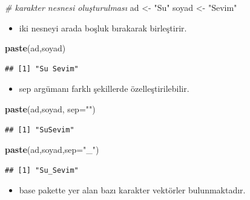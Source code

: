 \documentclass[
  oneside]{book}
\newenvironment{Shaded}{\begin{snugshade}}{\end{snugshade}}
\newcommand{\AttributeTok}[1]{\textcolor[rgb]{0.13,0.29,0.53}{#1}}
\newcommand{\CommentTok}[1]{\textcolor[rgb]{0.56,0.35,0.01}{\textit{#1}}}
\newcommand{\FunctionTok}[1]{\textcolor[rgb]{0.13,0.29,0.53}{\textbf{#1}}}
\newcommand{\NormalTok}[1]{#1}
\newcommand{\OtherTok}[1]{\textcolor[rgb]{0.56,0.35,0.01}{#1}}
\newcommand{\StringTok}[1]{\textcolor[rgb]{0.31,0.60,0.02}{#1}}
\providecommand{\tightlist}{%
  \setlength{\itemsep}{0pt}\setlength{\parskip}{0pt}}
\begin{document}
\begin{Shaded}
\begin{Highlighting}[]
\CommentTok{\# karakter nesnesi oluşturulması}
\NormalTok{ad }\OtherTok{\textless{}{-}} \StringTok{"Su"}
\NormalTok{soyad }\OtherTok{\textless{}{-}} \StringTok{"Sevim"}
\end{Highlighting}
\end{Shaded}

\begin{itemize}
\tightlist
\item
  iki nesneyi arada boşluk bırakarak birleştirir.
\end{itemize}

\begin{Shaded}
\begin{Highlighting}[]
\FunctionTok{paste}\NormalTok{(ad,soyad)}
\end{Highlighting}
\end{Shaded}

\begin{verbatim}
## [1] "Su Sevim"
\end{verbatim}

\begin{itemize}
\tightlist
\item
  sep argümanı farklı şekillerde özelleştirilebilir.
\end{itemize}

\begin{Shaded}
\begin{Highlighting}[]
\FunctionTok{paste}\NormalTok{(ad,soyad, }\AttributeTok{sep=}\StringTok{""}\NormalTok{)}
\end{Highlighting}
\end{Shaded}

\begin{verbatim}
## [1] "SuSevim"
\end{verbatim}

\begin{Shaded}
\begin{Highlighting}[]
\FunctionTok{paste}\NormalTok{(ad,soyad,}\AttributeTok{sep=}\StringTok{"\_"}\NormalTok{)}
\end{Highlighting}
\end{Shaded}

\begin{verbatim}
## [1] "Su_Sevim"
\end{verbatim}

\begin{itemize}
\tightlist
\item
  base pakette yer alan bazı karakter vektörler bulunmaktadır.
\end{itemize}
\end{document}
